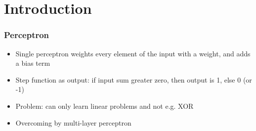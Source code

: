 \section{Introduction}
\subsubsection{Perceptron}
\begin{itemize}
	\item Single perceptron weights every element of the input with a weight, and adds a bias term
	\item Step function as output: if input sum greater zero, then output is 1, else 0 (or -1)
	\item Problem: can only learn linear problems and not e.g. XOR
	\item Overcoming by multi-layer perceptron 
\end{itemize}